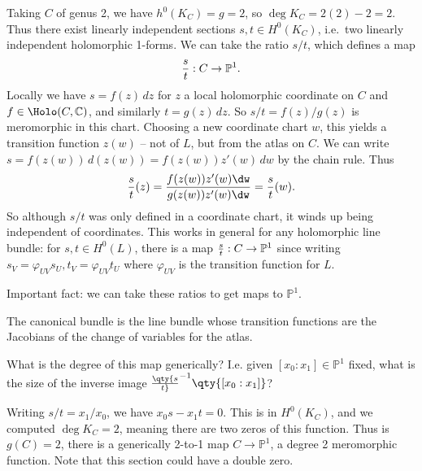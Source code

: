 \begin{example}

Taking \(C\) of genus 2, we have \(h^0(K_C) = g= 2\), so
\(\deg K_C = 2(2) - 2 = 2\). Thus there exist linearly independent
sections \(s, t \in H^0(K_C)\), i.e.~two linearly independent
holomorphic 1-forms. We can take the ratio \(s/t\), which defines a map
\begin{align*}
{s\over t}: C\to {\mathbb{P}}^1
.\end{align*}
Locally we have \(s = f(z) \,dz\) for \(z\) a local holomorphic
coordinate on \(C\) and \(f\in \Holo(C, {\mathbb{C}})\), and similarly
\(t = g(z) \,dz\). So \(s/t = f(z) / g(z)\) is meromorphic in this
chart. Choosing a new coordinate chart \(w\), this yields a transition
function \(z(w)\) -- not of \(L\), but from the atlas on \(C\). We can
write \(s =f(z(w)) \, d(z(w)) = f(z(w)) z'(w) \, dw\) by the chain rule.
Thus
\begin{align*}
{s\over t}(z) = {f(z(w)) z'(w) \dw \over g(z(w)) z'(w) \dw} = {s \over t}(w)
.\end{align*}
So although \(s/t\) was only defined in a coordinate chart, it winds up
being independent of coordinates. This works in general for any
holomorphic line bundle: for \(s, t\in H^0(L)\), there is a map
\({s\over t}: C\to {\mathbb{P}}^1\) since writing
\(s_V = \varphi_{UV} s_U, t_V = \varphi_{UV} t_U\) where
\(\varphi_{UV}\) is the transition function for \(L\).

\begin{fact}

Important fact: we can take these ratios to get maps to
\({\mathbb{P}}^1\).

\end{fact}

\begin{slogan}

The canonical bundle is the line bundle whose transition functions are
the Jacobians of the change of variables for the atlas.

\end{slogan}

\begin{question}

What is the degree of this map generically? I.e. given
\([x_0: x_1] \in {\mathbb{P}}^1\) fixed, what is the size of the inverse
image \(\qty{s\over t}^{-1}\qty{ [x_0: x_1] }\)?

\end{question}

\begin{answer}

Writing \(s/t = x_1/x_0\), we have \(x_0 s - x_1 t=0\). This is in
\(H^0(K_C)\), and we computed \(\deg K_C = 2\), meaning there are two
zeros of this function. Thus is \(g(C) = 2\), there is a generically
2-to-1 map \(C \to {\mathbb{P}}^1\), a degree 2 meromorphic function.
Note that this section could have a double zero.

\end{answer}

\end{example}

